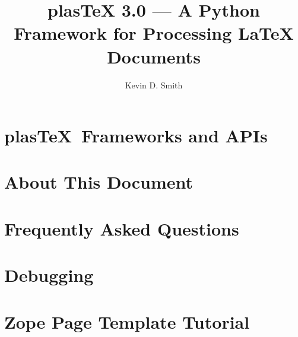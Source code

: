\documentclass{manual}
\title{plasTeX 3.0 --- A Python Framework for Processing LaTeX Documents}
\author{Kevin D. Smith}
\newcommand{\plasTeX}{plas\TeX}
\begin{document}
\maketitle
\cleardoublepage
\tableofcontents












\chapter{\plasTeX\ Frameworks and APIs}










\appendix

\chapter{About This Document}



\chapter{Frequently Asked Questions}



\chapter{Debugging}



\chapter{Zope Page Template Tutorial\label{sec:zpttutorial}}



\printindex
\end{document}
